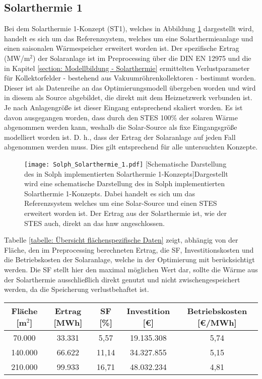 \subsection{Solarthermie 1}\label{subsection: Solarthermie 1}
Bei dem Solarthermie 1-Konzept (ST1), welches in Abbildung \ref{fig: Solph_Solarthermie_1} dargestellt wird, handelt es sich um das Referenzsystem, welches um eine Solarthermieanlage und einen saisonalen Wärmespeicher erweitert worden ist. Der spezifische Ertrag (MW/m$^2$) der Solaranlage ist im Preprocessing über die DIN EN 12975 und die in Kapitel \ref{section: Modellbildung - Solarthermie} ermittelten Verlustparameter für Kollektorfelder - bestehend aus Vakuumröhrenkollektoren - bestimmt worden. Dieser ist als Datenreihe an das Optimierungsmodell übergeben worden und wird in diesem als Source abgebildet, die direkt mit dem Heiznetzwerk verbunden ist. Je nach Anlagengröße ist dieser Eingang entsprechend skaliert worden. Es ist davon ausgegangen worden, dass durch den \ac{STES} 100\% der solaren Wärme abgenommen werden kann, weshalb die Solar-Source als fixe Eingangsgröße modelliert worden ist. D. h., dass der Ertrag der Solaranlage auf jeden Fall abgenommen werden muss. Dies gilt entsprechend für alle untersuchten Konzepte.
	\begin{figure}[ht]
		\centering
		\texttt{[image: Solph\_Solarthermie\_1.pdf]}
		[Schematische Darstellung des in Solph implementierten Solarthermie 1-Konzepts]{Dargestellt wird eine schematische Darstellung des in Solph implementierten Solarthermie 1-Konzepts. Dabei handelt es sich um das Referenzsystem welches um eine Solar-Source und einen \ac{STES} erweitert worden ist. Der Ertrag aus der Solarthermie ist, wie der \ac{STES} auch, direkt an das hnw angeschlossen.}
		\label{fig: Solph_Solarthermie_1}
	\end{figure}

Tabelle \ref{tabelle: Übersicht flächenspezifische Daten} zeigt, abhängig von der Fläche, den im Preprocessing berechneten Ertrag, die \ac{SF}, Investitionskosten und die Betriebskosten der Solaranlage, welche in der Optimierung mit berücksichtigt werden. Die \ac{SF} stellt hier den maximal möglichen Wert dar, sollte die Wärme aus der Solarthermie ausschließlich direkt genutzt und nicht zwischengespeichert werden, da die Speicherung verlustbehaftet ist. 
	\begin{center}
		\label{tabelle: Übersicht flächenspezifische Daten}
		\begin{tabular}{ccccc}
			\hline 
			Fläche [m$^2$] & Ertrag [MWh] & \ac{SF} [\%] & Investition [\euro]  & Betriebskosten [\euro/MWh] \tabularnewline
			\hline 
			70.000 & 33.331 & 5,57 & 19.135.308 & 5,74 \tabularnewline
			140.000 & 66.622 & 11,14 & 34.327.855 & 5,15 \tabularnewline
			210.000 & 99.933 & 16,71 & 48.032.234 & 4,81 \tabularnewline		
			\hline
		\end{tabular}
	\end{center} 

